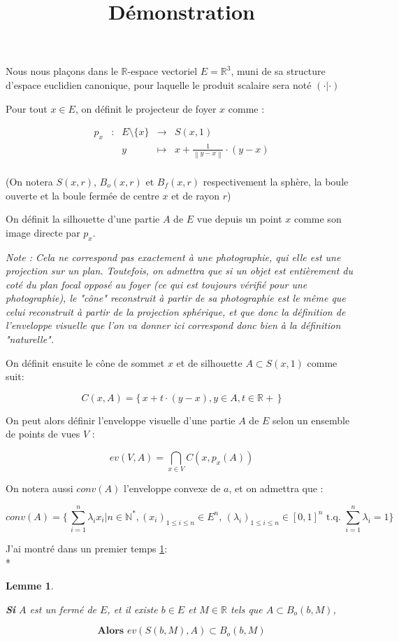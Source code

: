 \documentclass[a4paper]{article}
\title{Démonstration}
\newcommand{\norm}[1]{\left\lVert#1\right\rVert}
\newtheorem{lem}{Lemme}
\begin{document}
Nous nous plaçons dans le $\mathbb{R}$-espace vectoriel $E = \mathbb{R}^{3}$, muni de sa structure d'espace euclidien canonique, pour laquelle le produit scalaire sera noté $(\cdot|\cdot)$


Pour tout $x\in E$, on définit le projecteur de foyer $x$ comme :

\[\begin{array}{ccccl}
p_{x} & : & E\setminus\{x\} & \to & S(x, 1) \\
 & & y & \mapsto & x  + \frac{1}{\norm{y - x}} \cdot (y - x) \\
\end{array}\]

(On notera $S(x, r)$, $B_{o}(x, r)$ et $B_{f}(x, r)$ respectivement la sphère, la boule ouverte et la boule fermée de centre $x$ et de rayon $r$)


On définit la silhouette d'une  partie $A$ de $E$ vue depuis un point $x$ comme son image directe par $p_{x}$.

\textit{Note : Cela ne correspond pas exactement à une photographie, qui elle est une projection sur un plan. Toutefois, on admettra que si un objet est entièrement du coté du plan focal opposé au foyer (ce qui est toujours vérifié pour une photographie), le "cône" reconstruit à partir de sa photographie est le même que celui reconstruit à partir de la projection sphérique, et que donc la définition de l'enveloppe visuelle que l'on va donner ici correspond donc bien à la définition "naturelle".}

On définit ensuite le cône de sommet $x$ et de silhouette $A \subset S(x, 1)$ comme suit:

\[C(x,A) = \{\,x + t\cdot{}(y - x), y\in{}A, t\in\mathbb{R}+\,\}\]

On peut alors définir l'enveloppe visuelle d'une partie $A$ de $E$ selon un ensemble de points de vues $V$ :

\[ev(V, A) = \bigcap_{x\in{}V}C(x,p_{x}(A))\]

On notera aussi $conv(A)$ l'enveloppe convexe de $a$, et on admettra que :

\[conv(A) = \{\,\sum_{i=1}^{n} \lambda_{i} x_{i}| n\in{}\mathbb{N}^{*}, (x_{i})_{1\leqslant i \leqslant n} \in E^{n}, \, (\lambda_{i})_{1\leqslant i \leqslant n} \in [0, 1]^{n}\text{ t.q. } \sum_{i=1}^{n} \lambda_{i} = 1\}\]

J'ai montré dans un premier temps \ref{lem1}:\\*
\begin{lem}\label{lem1}

\textbf{Si} $A$ est un fermé de $E$, et il existe $b \in E$ et $M \in \mathbb{R}$ tels que $A \subset B_{o}(b, M)$,

\[\textbf{Alors } ev(S(b,M), A) \subset B_{o}(b, M)\]

\end{lem}
\end{document}
